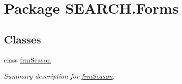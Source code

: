 \hypertarget{namespace_s_e_a_r_c_h_1_1_forms}{\section{Package S\-E\-A\-R\-C\-H.\-Forms}
\label{namespace_s_e_a_r_c_h_1_1_forms}
}
\subsection*{Classes}
\begin{DoxyCompactItemize}
\item 
class \hyperlink{class_s_e_a_r_c_h_1_1_forms_1_1frm_season}{frm\-Season}
\begin{DoxyCompactList}\small\item\em Summary description for \hyperlink{class_s_e_a_r_c_h_1_1_forms_1_1frm_season}{frm\-Season}. \end{DoxyCompactList}\end{DoxyCompactItemize}
